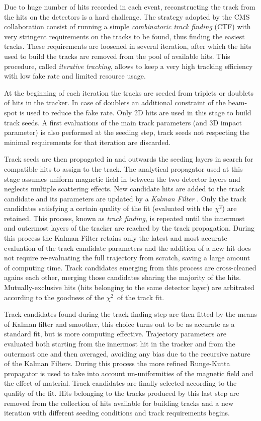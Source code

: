 Due to huge number of hits recorded in each event, reconstructing the track from the hits on the detectors is a hard challenge. The strategy adopted by the CMS collaboration consist of running a simple \emph{combinatoric track finding} (CTF) with very stringent requirements on the tracks to be found, thus finding the easiest tracks. These requirements are loosened in several iteration, after which the hits used to build the tracks are removed from the pool of available hits. This procedure, called \emph{iterative tracking}, allows to keep a very high tracking efficiency with low fake rate and limited resource usage. 

At the beginning of each iteration the tracks are seeded from triplets or doublets of hits in the tracker. In case of doublets an additional constraint of the beam-spot is used to reduce the fake rate. Only 2D hits are used in this stage to build track seeds. A first evaluations of the main track parameters (\pT and 3D impact parameter) is also performed at the seeding step, track seeds not respecting the minimal requirements for that iteration are discarded.

Track seeds are then propagated in and outwards the seeding layers in search for compatible hits to assign to the track. The analytical propagator used at this stage assumes uniform magnetic field in between the two detector layers and neglects multiple scattering effects. New candidate hits are added to the track candidate and its parameters are updated by a \emph{Kalman Filter} \cite{Fruhwirth:1987fm}. Only the track candidates satisfying a certain quality of the fit (evaluated with the $\chi^2$) are retained. This process, known as \emph{track finding}, is repeated until the innermost and outermost layers of the tracker are reached by the track propagation. During this process the Kalman Filter retains only the latest and most accurate evaluation of the track candidate parameters and the addition of a new hit does not require re-evaluating the full trajectory from scratch, saving a large amount of computing time. Track candidates emerging from this process are cross-cleaned agains each other, merging those candidates sharing the majority of the hits. Mutually-exclusive hits (hits belonging to the same detector layer) are arbitrated according to the goodness of the $\chi^2$\ of the track fit.

Track candidates found during the track finding step are then fitted by the means of Kalman filter and smoother, this choice turns out to be as accurate as a standard fit, but is more computing effective. Trajectory parameters are evaluated both starting from the innermost hit in the tracker and from the outermost one and then averaged, avoiding any bias due to the recursive nature of the Kalman Filters. During this process the more refined Runge-Kutta propagator is used to take into account un-uniformities of the magnetic field and the effect of material. Track candidates are finally selected according to the quality of the fit. Hits belonging to the tracks produced by this last step are removed from the collection of hits available for building tracks and a new iteration with different seeding conditions and track requirements begins. 


